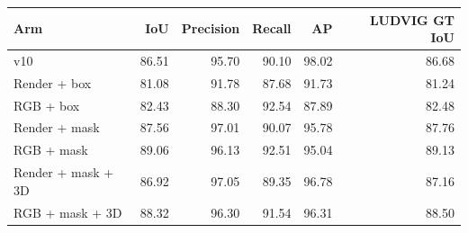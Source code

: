 \begin{tabular}{lrrrrr}
\toprule
Arm & IoU & Precision & Recall & AP & LUDVIG GT IoU \\
\midrule
v10 & 86.51 & 95.70 & 90.10 & 98.02 & 86.68 \\
Render + box & 81.08 & 91.78 & 87.68 & 91.73 & 81.24 \\
RGB + box & 82.43 & 88.30 & 92.54 & 87.89 & 82.48 \\
Render + mask & 87.56 & 97.01 & 90.07 & 95.78 & 87.76 \\
RGB + mask & 89.06 & 96.13 & 92.51 & 95.04 & 89.13 \\
Render + mask + 3D & 86.92 & 97.05 & 89.35 & 96.78 & 87.16 \\
RGB + mask + 3D & 88.32 & 96.30 & 91.54 & 96.31 & 88.50 \\
\bottomrule
\end{tabular}
